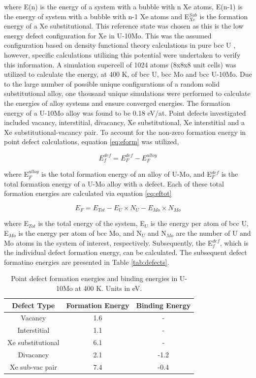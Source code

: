 \documentclass[review]{elsarticle}
\begin{document}
where E(n) is the energy of a system with a bubble with n Xe atoms, E(n-1) is the energy of system with a bubble with n-1 Xe atoms and E$_{Xe}^{Sub}$ is the formation energy of a Xe substitutional. This reference state was chosen as this is the low energy defect configuration for Xe in U-10Mo. This was the assumed configuration based on density functional theory calculations in pure bcc U \cite{beelerASTM}, however, specific calculations utilizing this potential were undertaken to verify this information. A simulation supercell of 1024 atoms (8x8x8 unit cells) was utilized to calculate the energy, at 400 K, of bcc U, bcc Mo and bcc U-10Mo. Due to the large number of possible unique configurations of a random solid substitutional alloy, one thousand unique simulations were performed to calculate the energies of alloy systems and ensure converged energies. The formation energy of a U-10Mo alloy was found to be 0.18 eV/at. Point defects investigated included vacancy, interstitial, divacancy, Xe substitutional, Xe interstitial and a Xe substitutional-vacancy pair. To account for the non-zero formation energy in point defect calculations, equation \ref{eq:eform} was utilized, 

\begin{equation}
\label{eq:eform}
E_f^{def}= E_F^{def} - E_F^{alloy} 
\end{equation}

where E$_F^{alloy}$ is the total formation energy of an alloy of U-Mo, and E$_F^{def}$ is the total formation energy of a U-Mo alloy with a defect. Each of these total formation energies are calculated via equation \ref{eq:eftot}

\begin{equation}
\label{eq:eftot}
E_F= E_{Tot} - E_U\times N_U - E_{Mo}\times N_{Mo}  
\end{equation}

where E$_{Tot}$ is the total energy of the system, E$_U$ is the energy per atom of bcc U, E$_{Mo}$ is the energy per atom of bcc Mo, and N$_U$ and N$_{Mo}$ are the number of U and Mo atoms in the system of interest, respectively. Subsequently, the E$_f^{def}$, which is the individual defect formation energy, can be calculated. The subsequent defect formatino energies are presented in Table \ref{tab:defects}. 

\begin{table}[h!]
\caption{Point defect formation energies and binding energies in U-10Mo at 400 K. Units in eV. }
\label{tab:defects}
\begin{center}
\begin{tabular}{|c|c|c|}
     \hline
Defect Type & Formation Energy & Binding Energy  \\
\hline
Vacancy & 1.6 & -  \\
Interstitial & 1.1 & - \\
Xe substitutional & 6.1 & - \\
Divacancy & 2.1 & -1.2 \\
Xe sub-vac pair & 7.4 & -0.4  \\
     \hline
\end{tabular}
\end{center}
\label{default}
\end{table}%
\end{document}
